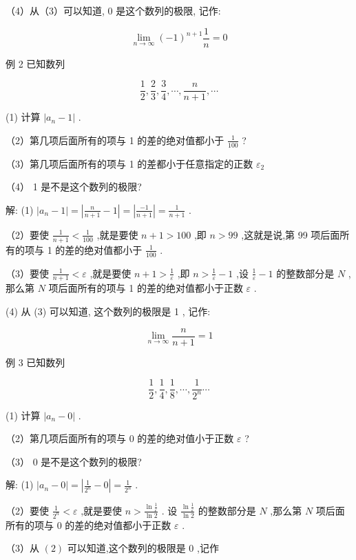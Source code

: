 \documentclass[10pt]{article}
\begin{document}
（4）从（3）可以知道, 0 是这个数列的极限, 记作:

\[
\mathop{\lim }\limits_{{n \rightarrow \infty }}{\left( -1\right) }^{n + 1}\frac{1}{n} = 0
\]

例 2 已知数列

\[
\frac{1}{2},\frac{2}{3},\frac{3}{4},\cdots ,\frac{n}{n + 1},\cdots
\]

(1) 计算 \(\left| {{a}_{n} - 1}\right|\) .

（2）第几项后面所有的项与 1 的差的绝对值都小于 \(\frac{1}{100}\) ?

（3）第几项后面所有的项与 1 的差都小于任意指定的正数 \({\varepsilon }_{2}\)

（4） 1 是不是这个数列的极限?

解: (1) \(\left| {{a}_{n} - 1}\right| = \left| {\frac{n}{n + 1} - 1}\right| = \left| \frac{-1}{n + 1}\right| = \frac{1}{n + 1}\) .

（2）要使 \(\frac{1}{n + 1} < \frac{1}{100}\) ,就是要使 \(n + 1 > {100}\) ,即 \(n > {99}\) ,这就是说,第 99 项后面所有的项与 1 的差的绝对值都小于 \(\frac{1}{100}\) .

（3）要使 \(\frac{1}{n + 1} < \varepsilon\) ,就是要使 \(n + 1 > \frac{1}{\varepsilon }\) ,即 \(n > \frac{1}{\varepsilon } - 1\) ,设 \(\frac{1}{\varepsilon } - 1\) 的整数部分是 \(N\) ,那么第 \(N\) 项后面所有的项与 1 的差的绝对值都小于正数 \(\varepsilon\) .

(4) 从 (3) 可以知道, 这个数列的极限是 1 , 记作:

\[
\mathop{\lim }\limits_{{n \rightarrow \infty }}\frac{n}{n + 1} = 1
\]

例 3 已知数列

\[
\frac{1}{2},\frac{1}{4},\frac{1}{8},\cdots ,\frac{1}{{2}^{n}}\cdots
\]

(1) 计算 \(\left| {{a}_{n} - 0}\right|\) .

（2）第几项后面所有的项与 0 的差的绝对值小于正数 \(\varepsilon\) ?

（3） 0 是不是这个数列的极限?

解: (1) \(\left| {{a}_{n} - 0}\right| = \left| {\frac{1}{{2}^{n}} - 0}\right| = \frac{1}{{2}^{n}}\) .

（2）要使 \(\frac{1}{{2}^{n}} < \varepsilon\) ,就是要使 \(n > \frac{\ln \frac{1}{\varepsilon }}{\ln 2}\) . 设 \(\frac{\ln \frac{1}{\varepsilon }}{\ln 2}\) 的整数部分是 \(N\) ,那么第 \(N\) 项后面所有的项与 0 的差的绝对值都小于正数 \(\varepsilon\) .

（3）从 \(\left( 2\right)\) 可以知道,这个数列的极限是 0 ,记作
\end{document}
